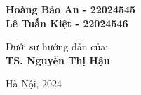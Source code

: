 \begin{center}
\begin{spacing}{0.5}
\textbf{\large {Hoàng Bảo An - 22024545}}\\
\textbf{\large {Lê Tuấn Kiệt - 22024546}}\\
\end{spacing}
\end{center}

\vspace{5 mm}
\begin{center}
\begin{spacing}{1.3}
{Dưới sự hướng dẫn của:}\\
    \textbf{\large {TS. Nguyễn Thị Hậu}}\\
\end{spacing}
\end{center}

\vspace{10 mm}
\begin{center}
    \large {Hà Nội, 2024}
\end{center}

